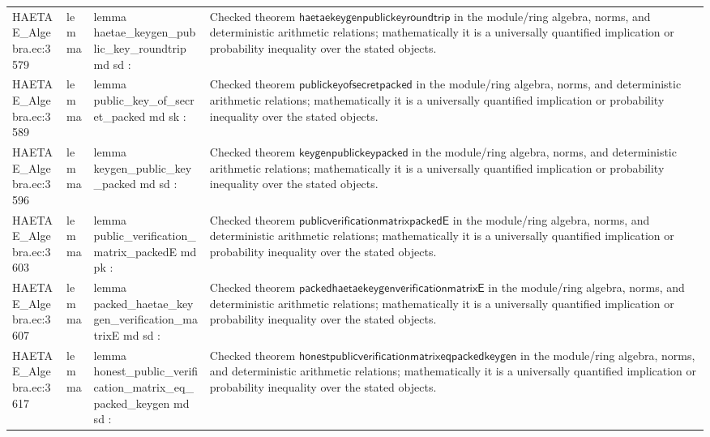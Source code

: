 \documentclass[10pt]{article}
\begin{document}
\begin{longtable}{L{0.11\textwidth}L{0.055\textwidth}L{0.385\textwidth}L{0.41\textwidth}}
HAETAE\_\allowbreak{}Algebra.\allowbreak{}ec:\allowbreak{}3579 & lemma & {\ttfamily\scriptsize lemma haetae\_\allowbreak{}keygen\_\allowbreak{}public\_\allowbreak{}key\_\allowbreak{}roundtrip md sd :} & Checked theorem $\mathsf{haetaekeygenpublickeyroundtrip}$ in the module/ring algebra, norms, and deterministic arithmetic relations; mathematically it is a universally quantified implication or probability inequality over the stated objects. \\
HAETAE\_\allowbreak{}Algebra.\allowbreak{}ec:\allowbreak{}3589 & lemma & {\ttfamily\scriptsize lemma public\_\allowbreak{}key\_\allowbreak{}of\_\allowbreak{}secret\_\allowbreak{}packed md sk :} & Checked theorem $\mathsf{publickeyofsecretpacked}$ in the module/ring algebra, norms, and deterministic arithmetic relations; mathematically it is a universally quantified implication or probability inequality over the stated objects. \\
HAETAE\_\allowbreak{}Algebra.\allowbreak{}ec:\allowbreak{}3596 & lemma & {\ttfamily\scriptsize lemma keygen\_\allowbreak{}public\_\allowbreak{}key\_\allowbreak{}packed md sd :} & Checked theorem $\mathsf{keygenpublickeypacked}$ in the module/ring algebra, norms, and deterministic arithmetic relations; mathematically it is a universally quantified implication or probability inequality over the stated objects. \\
HAETAE\_\allowbreak{}Algebra.\allowbreak{}ec:\allowbreak{}3603 & lemma & {\ttfamily\scriptsize lemma public\_\allowbreak{}verification\_\allowbreak{}matrix\_\allowbreak{}packedE md pk :} & Checked theorem $\mathsf{publicverificationmatrixpackedE}$ in the module/ring algebra, norms, and deterministic arithmetic relations; mathematically it is a universally quantified implication or probability inequality over the stated objects. \\
HAETAE\_\allowbreak{}Algebra.\allowbreak{}ec:\allowbreak{}3607 & lemma & {\ttfamily\scriptsize lemma packed\_\allowbreak{}haetae\_\allowbreak{}keygen\_\allowbreak{}verification\_\allowbreak{}matrixE md sd :} & Checked theorem $\mathsf{packedhaetaekeygenverificationmatrixE}$ in the module/ring algebra, norms, and deterministic arithmetic relations; mathematically it is a universally quantified implication or probability inequality over the stated objects. \\
HAETAE\_\allowbreak{}Algebra.\allowbreak{}ec:\allowbreak{}3617 & lemma & {\ttfamily\scriptsize lemma honest\_\allowbreak{}public\_\allowbreak{}verification\_\allowbreak{}matrix\_\allowbreak{}eq\_\allowbreak{}packed\_\allowbreak{}keygen md sd :} & Checked theorem $\mathsf{honestpublicverificationmatrixeqpackedkeygen}$ in the module/ring algebra, norms, and deterministic arithmetic relations; mathematically it is a universally quantified implication or probability inequality over the stated objects. \\

\end{longtable}
\end{document}
